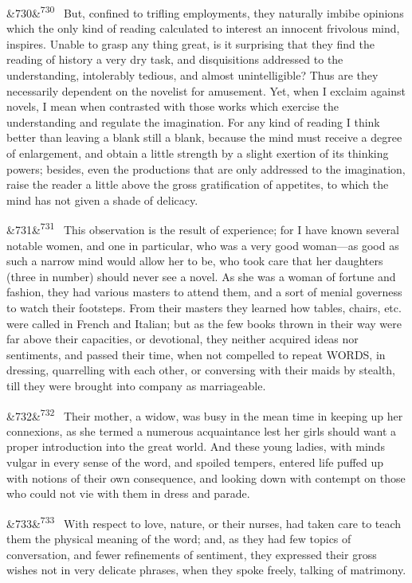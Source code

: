 \documentclass[12pt]{article}
\newcommand{\para}[1][]{\par\noindent\ifx&#1&\else\textsuperscript{\footnotesize #1}~\fi}
\begin{document}
\para[730] But, confined to trifling employments, they naturally imbibe opinions which the only kind of reading calculated to interest an innocent frivolous mind, inspires. Unable to grasp any thing great, is it surprising that they find the reading of history a very dry task, and disquisitions addressed to the understanding, intolerably tedious, and almost unintelligible? Thus are they necessarily dependent on the novelist for amusement. Yet, when I exclaim against novels, I mean when contrasted with those works which exercise the understanding and regulate the imagination. For any kind of reading I think better than leaving a blank still a blank, because the mind must receive a degree of enlargement, and obtain a little strength by a slight exertion of its thinking powers; besides, even the productions that are only addressed to the imagination, raise the reader a little above the gross gratification of appetites, to which the mind has not given a shade of delicacy.

\para[731] This observation is the result of experience; for I have known several notable women, and one in particular, who was a very good woman---as good as such a narrow mind would allow her to be, who took care that her daughters (three in number) should never see a novel. As she was a woman of fortune and fashion, they had various masters to attend them, and a sort of menial governess to watch their footsteps. From their masters they learned how tables, chairs, etc. were called in French and Italian; but as the few books thrown in their way were far above their capacities, or devotional, they neither acquired ideas nor sentiments, and passed their time, when not compelled to repeat WORDS, in dressing, quarrelling with each other, or conversing with their maids by stealth, till they were brought into company as marriageable.

\para[732] Their mother, a widow, was busy in the mean time in keeping up her connexions, as she termed a numerous acquaintance lest her girls should want a proper introduction into the great world. And these young ladies, with minds vulgar in every sense of the word, and spoiled tempers, entered life puffed up with notions of their own consequence, and looking down with contempt on those who could not vie with them in dress and parade.

\para[733] With respect to love, nature, or their nurses, had taken care to teach them the physical meaning of the word; and, as they had few topics of conversation, and fewer refinements of sentiment, they expressed their gross wishes not in very delicate phrases, when they spoke freely, talking of matrimony.
\end{document}
